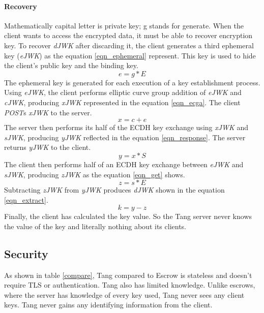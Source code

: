 \paragraph{Recovery}
Mathematically capital letter is private key; g stands for generate.
When the client wants to access the encrypted data, it must be able to recover encryption key.
To recover {\it dJWK} after discarding it, the client generates a third ephemeral key ({\it eJWK}) as the equation \ref{eqn_ephemeral} represent.
This key is used to hide the client's public key and the binding key.
\begin{equation}\label{eqn_ephemeral}
    e = g * E
\end{equation}
The ephemeral key is generated for each execution of a key establishment process.
Using {\it eJWK}, the client performs elliptic curve group addition of {\it eJWK} and {\it cJWK}, producing {\it xJWK} represented in the equation \ref{eqn_ecga}.
The client {\it POST}s {\it xJWK} to the server.
\begin{equation}\label{eqn_ecga}
    x = c + e
\end{equation}
The server then performs its half of the ECDH key exchange using {\it xJWK} and {\it sJWK}, producing {\it yJWK} reflected in the equation \ref{eqn_response}. The server returns {\it yJWK} to the client.
\begin{equation}\label{eqn_response}
    y = x * S
\end{equation}
The client then performs half of an ECDH key exchange between {\it eJWK} and {\it sJWK}, producing {\it zJWK} as the equation \ref{eqn_get} shows.
\begin{equation}\label{eqn_get}
    z = s * E
\end{equation}
Subtracting {\it zJWK} from {\it yJWK} produces {\it dJWK} shown in the equation \ref{eqn_extract}.
\begin{equation}\label{eqn_extract}
    k = y - z
\end{equation}
Finally, the client has calculated the key value.
So the Tang server never knows the value of the key and literally nothing about its clients.



\subsection{Security}

As shown in table \ref{compare}, Tang compared to Escrow is stateless and doesn't require TLS or authentication.
Tang also has limited knowledge.
Unlike escrows, where the server has knowledge of every key used, Tang never sees any client keys.
Tang never gains any identifying information from the client.

